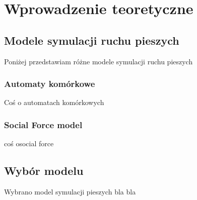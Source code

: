 \chapter{Wprowadzenie teoretyczne}
\label{cha:wprowadzenieTeoretyczne}

\section{Modele symulacji ruchu pieszych}
\label{sec:modeleSymulacji}

Poniżej przedstawiam różne modele symulacji ruchu pieszych

\subsection{Automaty komórkowe}

Coś o automatach komórkowych

\subsection{Social Force model}

coś osocial force

\section{Wybór modelu}
\label{sec:wyborModelu}

Wybrano model symulacji pieszych bla bla


















